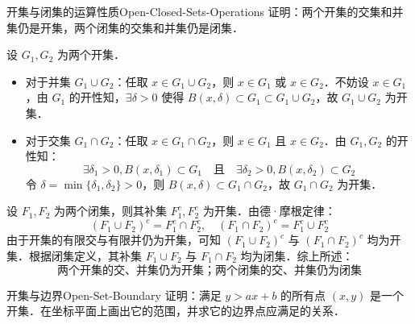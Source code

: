 \begin{problem}{开集与闭集的运算性质}{Open-Closed-Sets-Operations}
    证明：两个开集的交集和并集仍是开集，两个闭集的交集和并集仍是闭集．
\end{problem}

\begin{myproof}
    设 $G_1, G_2$ 为两个开集．
    \begin{itemize}
        \item 对于并集 $G_1 \cup G_2$：任取 $x \in G_1 \cup G_2$，则 $x \in G_1$ 或 $x \in G_2$．不妨设 $x \in G_1$，由 $G_1$ 的开性知，$\exists \delta > 0$ 使得 $B(x, \delta) \subset G_1 \subset G_1 \cup G_2$，故 $G_1 \cup G_2$ 为开集．
        \item 对于交集 $G_1 \cap G_2$：任取 $x \in G_1 \cap G_2$，则 $x \in G_1$ 且 $x \in G_2$．由 $G_1, G_2$ 的开性知：
              \begin{equation}
                  \exists \delta_1 > 0, B(x, \delta_1) \subset G_1 \quad \text{且} \quad \exists \delta_2 > 0, B(x, \delta_2) \subset G_2
              \end{equation}
              令 $\delta = \min\{\delta_1, \delta_2\} > 0$，则 $B(x, \delta) \subset G_1 \cap G_2$，故 $G_1 \cap G_2$ 为开集．
    \end{itemize}
    设 $F_1, F_2$ 为两个闭集，则其补集 $F_1^c, F_2^c$ 为开集．由德·摩根定律：
    \begin{equation}
        (F_1 \cup F_2)^c = F_1^c \cap F_2^c, \quad (F_1 \cap F_2)^c = F_1^c \cup F_2^c
    \end{equation}
    由于开集的有限交与有限并仍为开集，可知 $(F_1 \cup F_2)^c$ 与 $(F_1 \cap F_2)^c$ 均为开集．根据闭集定义，其补集 $F_1 \cup F_2$ 与 $F_1 \cap F_2$ 均为闭集．综上所述：
    \begin{equation}
        \boxed{\text{两个开集的交、并集仍为开集；两个闭集的交、并集仍为闭集}}
    \end{equation}
\end{myproof}


\begin{problem}{开集与边界}{Open-Set-Boundary}
    证明：满足 $y > ax + b$ 的所有点 $(x, y)$ 是一个开集．在坐标平面上画出它的范围，并求它的边界点应满足的关系．
\end{problem}

